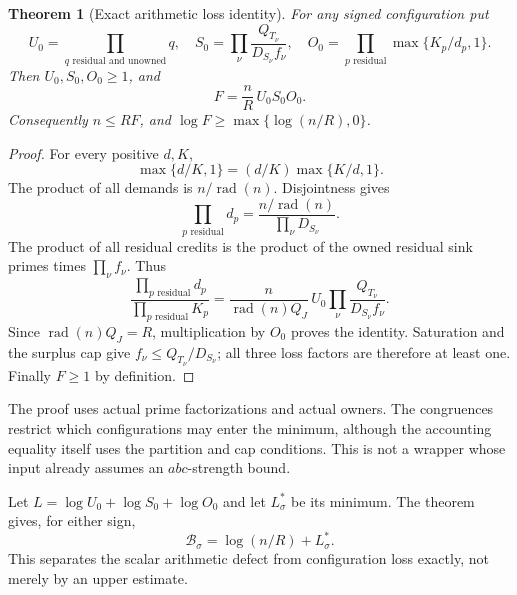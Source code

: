 \documentclass[11pt]{article}
\newtheorem{theorem}{Theorem}[section]
\theoremstyle{definition}\newtheorem{definition}[theorem]{Definition}
\theoremstyle{remark}\newtheorem{remark}[theorem]{Remark}
\DeclareMathOperator{\rad}{rad}
\newcommand{\B}{\mathcal B}
\begin{document}
\begin{theorem}[Exact arithmetic loss identity]\label{thm:loss}
For any signed configuration put
\[
 U_0=\prod_{q\text{ residual and unowned}}q,\quad
 S_0=\prod_\nu\frac{Q_{T_\nu}}{D_{S_\nu}f_\nu},\quad
 O_0=\prod_{p\text{ residual}}\max\{K_p/d_p,1\}.
\]
Then \(U_0,S_0,O_0\ge1\), and
\begin{equation}\label{eq:loss}
 \boxed{F=\frac nR\,U_0S_0O_0.}
\end{equation}
Consequently \(n\le RF\), and \(\log F\ge\max\{\log(n/R),0\}\).
\end{theorem}
\begin{proof}
For every positive \(d,K\),
\[
 \max\{d/K,1\}=(d/K)\max\{K/d,1\}.
\]
The product of all demands is \(n/\rad(n)\). Disjointness gives
\[
 \prod_{p\text{ residual}}d_p
 =\frac{n/\rad(n)}{\prod_\nu D_{S_\nu}}.
\]
The product of all residual credits is the product of the owned residual sink primes times \(\prod_\nu f_\nu\). Thus
\[
 \frac{\prod_{p\text{ residual}}d_p}{\prod_{p\text{ residual}}K_p}
 =\frac{n}{\rad(n)Q_J}\,
 U_0\prod_\nu\frac{Q_{T_\nu}}{D_{S_\nu}f_\nu}.
\]
Since \(\rad(n)Q_J=R\), multiplication by \(O_0\) proves the identity. Saturation and the surplus cap give \(f_\nu\le Q_{T_\nu}/D_{S_\nu}\); all three loss factors are therefore at least one. Finally \(F\ge1\) by definition.
\end{proof}
The proof uses actual prime factorizations and actual owners. The congruences restrict which configurations may enter the minimum, although the accounting equality itself uses the partition and cap conditions. This is not a wrapper whose input already assumes an \(abc\)-strength bound.

Let \(L=\log U_0+\log S_0+\log O_0\) and let \(L^*_\sigma\) be its minimum. The theorem gives, for either sign,
\begin{equation}\label{eq:Lstar}
 \B_\sigma=\log(n/R)+L^*_\sigma.
\end{equation}
This separates the scalar arithmetic defect from configuration loss exactly, not merely by an upper estimate.
\end{document}
